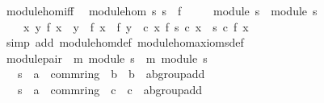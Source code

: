 \begin{isabellebody}
{\isafoldproof}%
%
\isadelimproof
\isanewline
%
\endisadelimproof
\isanewline
{}\isamarkupfalse%
\isanewline
\isanewline
{}\isamarkupfalse%
\ module{\isacharunderscore}{\kern0pt}hom{\isacharunderscore}{\kern0pt}iff{\isacharcolon}{\kern0pt}\isanewline
\ \ {\isachardoublequoteopen}module{\isacharunderscore}{\kern0pt}hom\ s{}\ s{}\ \ f\ {\isasymlongleftrightarrow}\isanewline
\ \ \ \ module\ s{}\ {\isasymand}\ module\ s{}\ {\isasymand}\isanewline
\ \ \ \ {\isacharparenleft}{\kern0pt}{\isasymforall}x\ y{\isachardot}{\kern0pt}\ f\ {\isacharparenleft}{\kern0pt}x\ {\isacharplus}{\kern0pt}\ y{\isacharparenright}{\kern0pt}\ {\isacharequal}{\kern0pt}\ f\ x\ {\isacharplus}{\kern0pt}\ f\ y{\isacharparenright}{\kern0pt}\ {\isasymand}\ {\isacharparenleft}{\kern0pt}{\isasymforall}c\ x{\isachardot}{\kern0pt}\ f\ {\isacharparenleft}{\kern0pt}s{}\ c\ x{\isacharparenright}{\kern0pt}\ {\isacharequal}{\kern0pt}\ s{}\ c\ {\isacharparenleft}{\kern0pt}f\ x{\isacharparenright}{\kern0pt}{\isacharparenright}{\kern0pt}{\isachardoublequoteclose}\isanewline
%
\isadelimproof
\ \ %
\endisadelimproof
%
\isatagproof
{}\isamarkupfalse%
\ {\isacharparenleft}{\kern0pt}simp\ add{\isacharcolon}{\kern0pt}\ module{\isacharunderscore}{\kern0pt}hom{\isacharunderscore}{\kern0pt}def\ module{\isacharunderscore}{\kern0pt}hom{\isacharunderscore}{\kern0pt}axioms{\isacharunderscore}{\kern0pt}def{\isacharparenright}{\kern0pt}%
\endisatagproof
{\isafoldproof}%
%
\isadelimproof
\isanewline
%
\endisadelimproof
\isanewline
{}\isamarkupfalse%
\ module{\isacharunderscore}{\kern0pt}pair\ {\isacharequal}{\kern0pt}\ m{}{\isacharcolon}{\kern0pt}\ module\ s{}\ {\isacharplus}{\kern0pt}\ m{}{\isacharcolon}{\kern0pt}\ module\ s{}\isanewline
\ \ \ s{}\ {\isacharcolon}{\kern0pt}{\isacharcolon}{\kern0pt}\ {\isachardoublequoteopen}{\isacharprime}{\kern0pt}a\ {\isacharcolon}{\kern0pt}{\isacharcolon}{\kern0pt}\ comm{\isacharunderscore}{\kern0pt}ring{\isacharunderscore}{\kern0pt}{}\ {\isasymRightarrow}\ {\isacharprime}{\kern0pt}b\ {\isasymRightarrow}\ {\isacharprime}{\kern0pt}b\ {\isacharcolon}{\kern0pt}{\isacharcolon}{\kern0pt}\ ab{\isacharunderscore}{\kern0pt}group{\isacharunderscore}{\kern0pt}add{\isachardoublequoteclose}\isanewline
\ \ \ s{}\ {\isacharcolon}{\kern0pt}{\isacharcolon}{\kern0pt}\ {\isachardoublequoteopen}{\isacharprime}{\kern0pt}a\ {\isacharcolon}{\kern0pt}{\isacharcolon}{\kern0pt}\ comm{\isacharunderscore}{\kern0pt}ring{\isacharunderscore}{\kern0pt}{}\ {\isasymRightarrow}\ {\isacharprime}{\kern0pt}c\ {\isasymRightarrow}\ {\isacharprime}{\kern0pt}c\ {\isacharcolon}{\kern0pt}{\isacharcolon}{\kern0pt}\ ab{\isacharunderscore}{\kern0pt}group{\isacharunderscore}{\kern0pt}add{\isachardoublequoteclose}\isanewline

\end{isabellebody}
